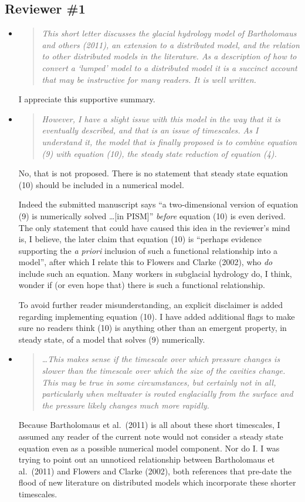 \documentclass[11pt,reqno]{amsart}
\newcommand{\reply}[2]{
\medskip\medskip
\item  \begin{quote}
\emph{#1}
\end{quote}

\medskip
\noindent #2}
\begin{document}
\subsection*{Reviewer \#1}  \begin{itemize}
\reply{This short letter discusses the glacial hydrology model of Bartholomaus and others (2011), an extension to a distributed model, and the relation to other distributed models in the literature.  As a description of how to convert a `lumped' model to a distributed model it is a succinct account that may be instructive for many readers.  It is well written.}
{I appreciate this supportive summary.}

\reply{However, I have a slight issue with this model in the way that it is eventually described, and that is an issue of timescales.  As I understand it, the model that is finally proposed is to combine equation (9) with equation (10), the steady state reduction of equation (4).}
{No, that is not proposed.  There is no statement that steady state equation (10) should be included in a numerical model.

Indeed the submitted manuscript says ``a two-dimensional version of equation (9) is numerically solved \dots [in PISM]'' \emph{before} equation (10) is even derived.  The only statement that could have caused this idea in the reviewer's mind is, I believe, the later claim that equation (10) is ``perhaps evidence supporting the \emph{a priori} inclusion of such a functional relationship into a model'', after which I relate this to Flowers and Clarke (2002), who \emph{do} include such an equation.  Many workers in subglacial hydrology do, I think, wonder if (or even hope that) there is such a functional relationship.

To avoid further reader misunderstanding, an explicit disclaimer is added regarding implementing equation (10).  I have added additional flags to make sure no readers think (10) is anything other than an emergent property, in steady state, of a model that solves (9) numerically.}

\reply{\dots This makes sense if the timescale over which pressure changes is slower than the timescale over which the size of the cavities change. This may be true in some circumstances, but certainly not in all, particularly when meltwater is routed englacially from the surface and the pressure likely changes much more rapidly.}
{Because Bartholomaus et al.~(2011) is all about these short timescales, I assumed any reader of the current note would not consider a steady state equation even as a possible numerical model component.  Nor do I.  I was trying to point out an unnoticed relationship between Bartholomaus et al.~(2011) and Flowers and Clarke (2002), both references that pre-date the flood of new literature on distributed models which incorporate these shorter timescales.

}
\end{itemize}
\end{document}
